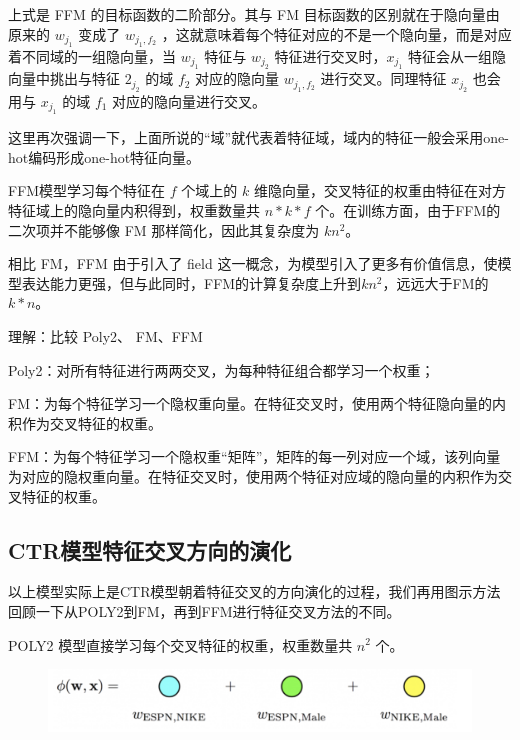 \documentclass[12pt]{article}
\begin{document}
上式是 FFM 的目标函数的二阶部分。其与 FM 目标函数的区别就在于隐向量由原来的 $w_{j_1}$ 变成了 $w_{j_1, f_2}$  ，这就意味着每个特征对应的不是一个隐向量，而是对应着不同域的一组隐向量，当 $w_{j_1}$ 特征与 $w_{j_2}$ 特征进行交叉时，$x_{j_1}$ 特征会从一组隐向量中挑出与特征 $2_{j_2}$ 的域 $f_2$ 对应的隐向量 $w_{j_1, f_2}$ 进行交叉。同理特征 $x_{j_2}$ 也会用与 $x_{j_1}$ 的域 $f_1$ 对应的隐向量进行交叉。

这里再次强调一下，上面所说的“域”就代表着特征域，域内的特征一般会采用one-hot编码形成one-hot特征向量。

FFM模型学习每个特征在 $f$ 个域上的 $k$ 维隐向量，交叉特征的权重由特征在对方特征域上的隐向量内积得到，权重数量共 $n*k*f$ 个。在训练方面，由于FFM的二次项并不能够像 FM 那样简化，因此其复杂度为 $kn^2$。

相比 FM，FFM 由于引入了 field 这一概念，为模型引入了更多有价值信息，使模型表达能力更强，但与此同时，FFM的计算复杂度上升到$kn^2$，远远大于FM的 $k*n$。

\begin{framed}
理解：比较 Poly2、 FM、FFM

Poly2：对所有特征进行两两交叉，为每种特征组合都学习一个权重；

FM：为每个特征学习一个隐权重向量。在特征交叉时，使用两个特征隐向量的内积作为交叉特征的权重。

FFM：为每个特征学习一个隐权重“矩阵”，矩阵的每一列对应一个域，该列向量为对应的隐权重向量。在特征交叉时，使用两个特征对应域的隐向量的内积作为交叉特征的权重。
\end{framed}

\subsection{CTR模型特征交叉方向的演化}
以上模型实际上是CTR模型朝着特征交叉的方向演化的过程，我们再用图示方法回顾一下从POLY2到FM，再到FFM进行特征交叉方法的不同。

POLY2 模型直接学习每个交叉特征的权重，权重数量共 $n^2$ 个。
\begin{figure}[H]
    \centering
    \includegraphics[width=1\textwidth]{fig/CTR_Comparison_Poly2.png}
\end{figure}
\end{document}
